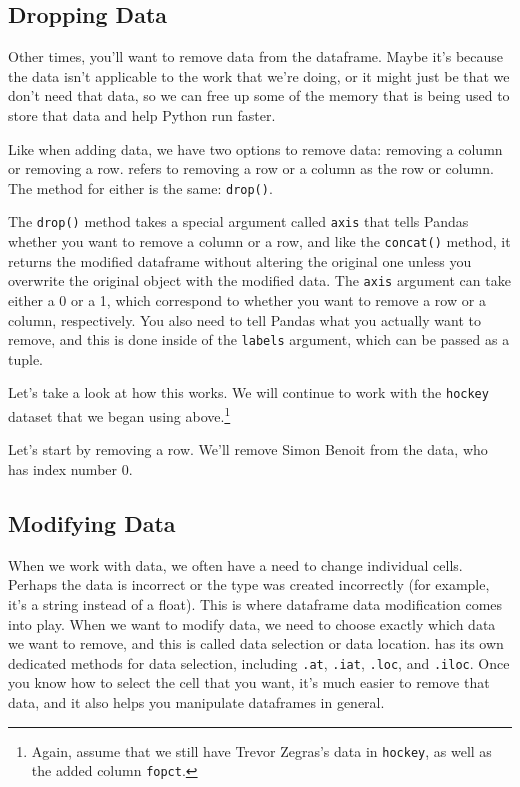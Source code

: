 \subsection{Dropping Data}
Other times, you'll want to remove data from the dataframe. Maybe it's because the data isn't applicable to the work that we're doing, or it might just be that we don't need that data, so we can free up some of the memory that is being used to store that data and help Python run faster.\par
Like when adding data, we have two options to remove data: removing a column or removing a row.  refers to removing a row or a column as  the row or column. The method for either is the same: \verb|drop()|.\par
The \verb|drop()| method takes a special argument called \verb|axis| that tells Pandas whether you want to remove a column or a row, and like the \verb|concat()| method, it returns the modified dataframe without altering the original one unless you overwrite the original object with the modified data. The \verb|axis| argument can take either a 0 or a 1, which correspond to whether you want to remove a row or a column, respectively. You also need to tell Pandas what you actually want to remove, and this is done inside of the \verb|labels| argument, which can be passed as a tuple.\par
Let's take a look at how this works. We will continue to work with the \verb|hockey| dataset that we began using above.\cprotect\footnote{Again, assume that we still have Trevor Zegras's data in \verb|hockey|, as well as the added column \verb|fopct|.}\par
Let's start by removing a row. We'll remove Simon Benoit from the data, who has index number 0.

\subsection{Modifying Data}
When we work with data, we often have a need to change individual cells. Perhaps the data is incorrect or the type was created incorrectly (for example, it's a string instead of a float). This is where dataframe data modification comes into play. When we want to modify data, we need to choose exactly which data we want to remove, and this is called data selection or data location.  has its own dedicated methods for data selection, including \verb|.at|, \verb|.iat|, \verb|.loc|, and \verb|.iloc|. Once you know how to select the cell that you want, it's much easier to remove that data, and it also helps you manipulate dataframes in general.
